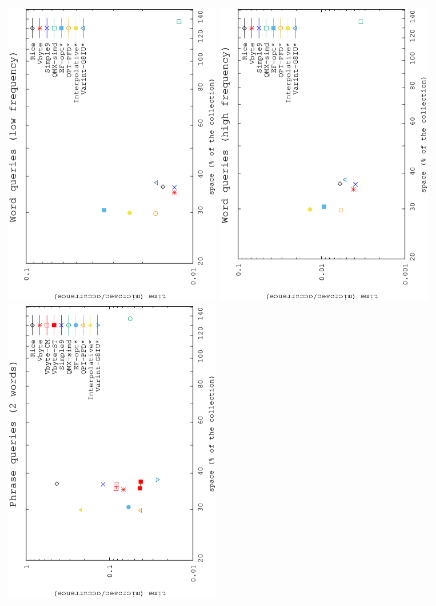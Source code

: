 \documentclass[review]{elsarticle}
\begin{document}
\begin{figure}[t]
\begin{center}
\includegraphics[angle=-90,width=0.49\textwidth]{../figures/f3/words1-1000/locate-words1-1000.eps}
\includegraphics[angle=-90,width=0.49\textwidth]{../figures/f3/words1001-100k/locate-words1001-100k.eps}
\includegraphics[angle=-90,width=0.49\textwidth]{../figures/f3/phrases2-2/locate-2_2.eps}

\end{center}
\end{figure}
\end{document}

